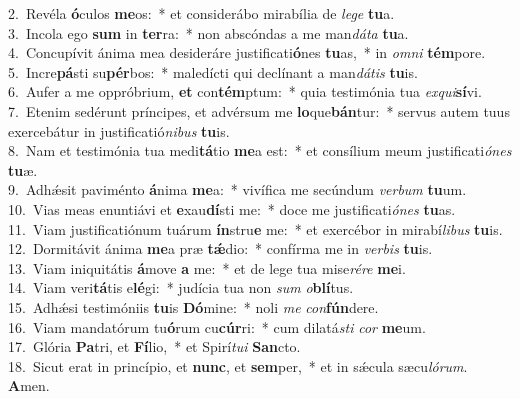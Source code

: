 {2.~}Revéla \textbf{ó}culos \textbf{me}os:~* et considerábo mirabília de \textit{le}\textit{ge} \textbf{tu}a.\\
{3.~}Incola ego \textbf{sum} in \textbf{ter}ra:~* non abscóndas a me man\textit{dá}\textit{ta} \textbf{tu}a.\\
{4.~}Concupívit ánima mea desideráre justificati\textbf{ó}nes \textbf{tu}as,~* in \textit{om}\textit{ni} \textbf{tém}pore.\\
{5.~}Incre\textbf{pá}sti su\textbf{pér}bos:~* maledícti qui declínant a man\textit{dá}\textit{tis} \textbf{tu}is.\\
{6.~}Aufer a me oppróbrium, \textbf{et} con\textbf{tém}ptum:~* quia testimónia tua \textit{ex}\textit{qui}\textbf{sí}vi.\\
{7.~}Etenim sedérunt príncipes, et advérsum me \textbf{lo}que\textbf{bán}tur:~* servus autem tuus exercebátur in justificatió\textit{ni}\textit{bus} \textbf{tu}is.\\
{8.~}Nam et testimónia tua medi\textbf{tá}tio \textbf{me}a est:~* et consílium meum justificati\textit{ó}\textit{nes} \textbf{tu}æ.\\
{9.~}Adhǽsit paviménto \textbf{á}nima \textbf{me}a:~* vivífica me secúndum \textit{ver}\textit{bum} \textbf{tu}um.\\
{10.~}Vias meas enuntiávi et \textbf{e}xau\textbf{dí}sti me:~* doce me justificati\textit{ó}\textit{nes} \textbf{tu}as.\\
{11.~}Viam justificatiónum tuárum \textbf{ín}stru\textbf{e} me:~* et exercébor in mirabí\textit{li}\textit{bus} \textbf{tu}is.\\
{12.~}Dormitávit ánima \textbf{me}a præ \textbf{tǽ}dio:~* confírma me in \textit{ver}\textit{bis} \textbf{tu}is.\\
{13.~}Viam iniquitátis \textbf{á}move \textbf{a} me:~* et de lege tua mise\textit{ré}\textit{re} \textbf{me}i.\\
{14.~}Viam veri\textbf{tá}tis e\textbf{lé}gi:~* judícia tua non \textit{sum} \textit{o}\textbf{blí}tus.\\
{15.~}Adhǽsi testimóniis \textbf{tu}is \textbf{Dó}mine:~* noli \textit{me} \textit{con}\textbf{fún}dere.\\
{16.~}Viam mandatórum tu\textbf{ó}rum cu\textbf{cúr}ri:~* cum dilatá\textit{sti} \textit{cor} \textbf{me}um.\\
{17.~}Glória \textbf{Pa}tri, et \textbf{Fí}lio,~* et Spirí\textit{tu}\textit{i} \textbf{San}cto.\\
{18.~}Sicut erat in princípio, et \textbf{nunc}, et \textbf{sem}per,~* et in sǽcula sæcu\textit{ló}\textit{rum}. \textbf{A}men.\\
